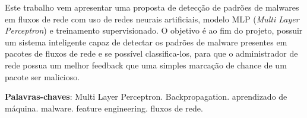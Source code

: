 \begin{resumo}

 Este trabalho vem apresentar uma proposta de detecção de padrões de malwares em fluxos de rede com uso de redes neurais artificiais, modelo MLP (\textit{Multi Layer Perceptron}) e treinamento supervisionado. O objetivo é ao fim do projeto, possuir um sistema inteligente capaz de detectar os padrões de malware presentes em pacotes de fluxos de rede e se possível classifica-los, para que o administrador de rede possua um melhor feedback que uma simples marcação de chance de um pacote ser malicioso.

 \vspace{\onelineskip}

 \noindent
 \textbf{Palavras-chaves}: Multi Layer Perceptron. Backpropagation. aprendizado de máquina. malware. feature engineering. fluxos de rede.
\end{resumo}
